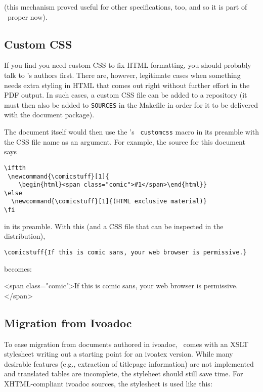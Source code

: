 \documentclass[11pt,a4paper]{ivoa}
\newcommand{\texword}[1]{\texttt{\color{texcolor} #1}}
\newcommand{\comicstuff}[1]{
    \begin{html}<span class="comic">#1</span>\end{html}}
\newcommand{\comicstuff}[1]{(HTML exclusive material)}
\begin{document}
(this mechanism proved useful for other specifications, too, and so
it is part of \ivoatex~proper now).

\subsection{Custom CSS}
\label{sect:customcss}

If you find you need custom CSS to fix HTML formatting, you should
probably talk to \ivoatex's authors first.  There are, however, 
legitimate cases when something needs extra styling in HTML that 
comes out right without further effort
in the PDF output.  In such cases, a custom CSS file can
be added to a repository (it must then also be added to \texttt{SOURCES}
in the Makefile in order for it to be delivered with the document
package).

The document itself would then use the \ivoatex's \texword{customcss}
macro in its preamble with the CSS file name as an argument.  For
example, the source for this document says

\begin{lstlisting}
\iftth
 \newcommand{\comicstuff}[1]{
    \begin{html}<span class="comic">#1</span>\end{html}}
\else
  \newcommand{\comicstuff}[1]{(HTML exclusive material)}
\fi
\end{lstlisting}

\noindent in its preamble.  With this (and a CSS file that can be inspected in the
distribution),

\begin{lstlisting}
\comicstuff{If this is comic sans, your web browser is permissive.}
\end{lstlisting}

\noindent becomes: 
\comicstuff{If this is comic sans, your web browser is permissive.}

\subsection{Migration from Ivoadoc}

To ease migration from documents authored in ivoadoc, \ivoatex\ comes
with an XSLT stylesheet writing out a starting point for an ivoatex
version.  While many desirable features (e.g., extraction of titlepage
information) are not implemented and translated tables are incomplete,
the styleheet should still save time.  For XHTML-compliant ivoadoc
sources, the stylesheet is used like this:
\end{document}
